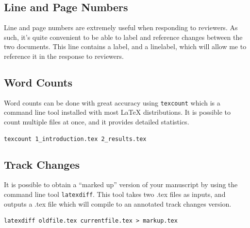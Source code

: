     \subsection{Line and Page Numbers}
%
Line and page numbers are extremely useful when responding to reviewers.
As such, it's quite convenient to be able to label and reference changes between the two documents.
This line contains a label,\label{point:1} and a linelabel, which will allow me to reference it in the response to reviewers.
%
    \subsection{Word Counts}
%
Word counts can be done with great accuracy using \verb|texcount| which is a command line tool installed with most LaTeX distributions.
It is possible to count multiple files at once, and it provides detailed statistics.
\begin{center}
    \verb|texcount 1_introduction.tex 2_results.tex|
\end{center}
%
    \subsection{Track Changes}
%
It is possible to obtain a ``marked up'' version of your manuscript by using the command line tool \verb|latexdiff|.
This tool takes two .tex files as inputs, and outputs a .tex file which will compile to an annotated track changes version.
\begin{center}
    \verb|latexdiff oldfile.tex currentfile.tex > markup.tex|
\end{center}